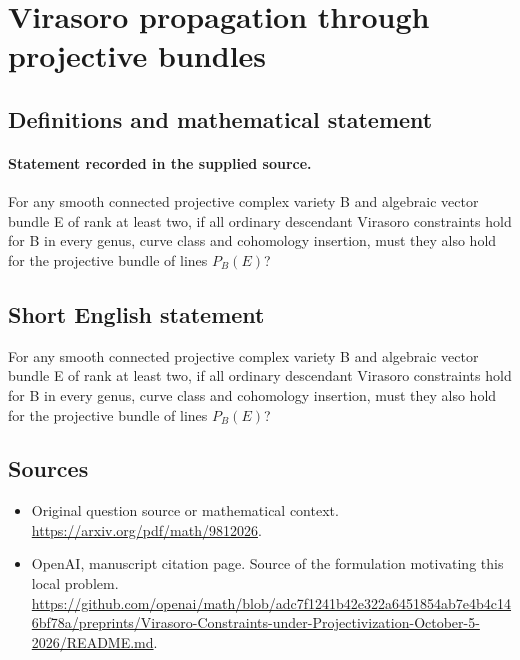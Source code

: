 \documentclass[11pt]{article}
\begin{document}
\section*{Virasoro propagation through projective bundles}\label{statement}
\subsection{Definitions and mathematical statement}
\paragraph{Statement recorded in the supplied source.}
For any smooth connected projective complex variety B and algebraic vector bundle E of rank at least two, if all ordinary descendant Virasoro constraints hold for B in every genus, curve class and cohomology insertion, must they also hold for the projective bundle of lines $P_B(E)$?
\subsection{Short English statement}
For any smooth connected projective complex variety B and algebraic vector bundle E of rank at least two, if all ordinary descendant Virasoro constraints hold for B in every genus, curve class and cohomology insertion, must they also hold for the projective bundle of lines $P_B(E)$?
\subsection{Sources}
\begin{itemize}
\item[S1] Original question source or mathematical context.
\url{https://arxiv.org/pdf/math/9812026}.
\item[S2] OpenAI, manuscript citation page. Source of the formulation motivating this local problem.
\url{https://github.com/openai/math/blob/adc7f1241b42e322a6451854ab7e4b4c146bf78a/preprints/Virasoro-Constraints-under-Projectivization-October-5-2026/README.md}.
\end{itemize}
\end{document}
